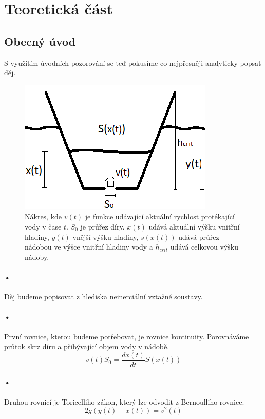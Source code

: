 \documentclass[14pt,a4paper]{article}
\begin{document}
\section{Teoretická část}
\subsection{Obecný úvod}
S využitím úvodních pozorování se teď pokusíme co nejpřesněji analyticky popsat děj.\\
\begin{figure}[H]
\centering
\includegraphics[scale=0.8]{Nakres.png}
\caption{Nákres, kde $v(t)$ je funkce udávající aktuální rychlost protékající vody v čase $t$. $S_0$ je průřez díry. $x(t)$ udává aktuální výšku vnitřní hladiny, $y(t)$ vnější výšku hladiny, $s(x(t))$ udává průřez nádobou ve výšce vnitřní hladiny vody a $h_{crit}$ udává celkovou výšku nádoby.}
\label{nakres}
\end{figure}
\paragraph*{•}
Děj budeme popisovat z hlediska neinerciální vztažné soustavy.
\paragraph*{•}
První rovnice, kterou budeme potřebovat, je rovnice kontinuity. Porovnáváme průtok skrz díru a přibývající objem vody v nádobě.
\begin{equation}
v(t)S_0=\frac{dx(t)}{dt}S(x(t))
\end{equation}
\paragraph*{•}
Druhou rovnicí je Toricelliho zákon, který lze odvodit z Bernoulliho rovnice.
\begin{equation}
2g(y(t)-x(t))=v^2(t)
\end{equation}
\end{document}
